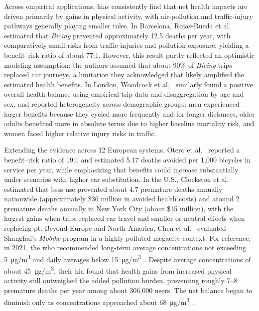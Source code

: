 Across empirical applications, \acp{hia} consistently find that net health impacts are driven primarily by gains in physical activity, with air-pollution and traffic-injury pathways generally playing smaller roles. In Barcelona, Rojas-Rueda et al.~\cite{Rojas-Rueda2011} estimated that \textit{Bicing} prevented approximately 12.5 deaths per year, with comparatively small risks from traffic injuries and pollution exposure, yielding a benefit--risk ratio of about 77:1. However, this result partly reflected an optimistic modeling assumption: the authors assumed that about 90\% of \textit{Bicing} trips replaced car journeys, a limitation they acknowledged that likely amplified the estimated health benefits. In London, Woodcock et al.~\cite{Woodcock2014} similarly found a positive overall health balance using empirical trip data and disaggregation by age and sex, and reported heterogeneity across demographic groups: men experienced larger benefits because they cycled more frequently and for longer distances, older adults benefited more in absolute terms due to higher baseline mortality risk, and women faced higher relative injury risks in traffic.
 
Extending the evidence across 12 European systems, Otero et al.~\cite{Otero2018} reported a benefit--risk ratio of 19:1 and estimated 5.17 deaths avoided per 1,000 bicycles in service per year, while emphasizing that benefits could increase substantially under scenarios with higher car substitution. In the U.S., Clockston et al.~\cite{Clockston2021} estimated that \acp{bss} use prevented about 4.7 premature deaths annually nationwide (approximately \$36 million in avoided health costs) and around 2 premature deaths annually in New York City (about \$15 million), with the largest gains when trips replaced car travel and smaller or neutral effects when replacing \ac{pt}. Beyond Europe and North America, Chen et al.~\cite{Chen2023} evaluated Shanghai’s \textit{Mobike} program in a highly polluted megacity context. For reference, in 2021, the \ac{who} recommended long-term average  concentrations not exceeding 5~\si{\micro g/m^3} and daily averages below 15~\si{\micro g/m^3}~\cite{WHO2021}. Despite average  concentrations of about 45~\si{\micro g/m^3}, their \ac{hia} found that health gains from increased physical activity still outweighed the added pollution burden, preventing roughly 7--8 premature deaths per year among about 306,000 users. The net balance began to diminish only as concentrations approached about 68~\si{\micro g/m^3}~\cite{Chen2023}.

